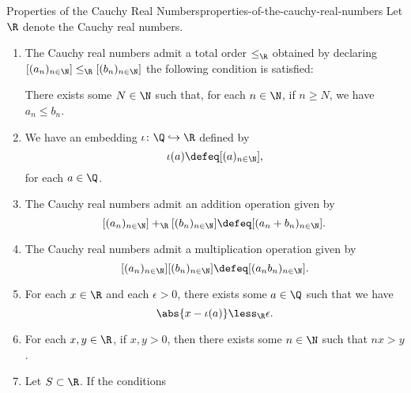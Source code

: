 \begin{proposition}{Properties of the Cauchy Real Numbers}{properties-of-the-cauchy-real-numbers}%
    Let $\R$ denote the Cauchy real numbers.
    \begin{enumerate}
        \item\label{properties-of-the-cauchy-real-numbers-total-order}The Cauchy real numbers admit a total order $\leq_{\R}$ obtained by declaring $[(a_{n})_{n\in\N}]\leq_{\R}[(b_{n})_{n\in\N}]$ \textiff the following condition is satisfied:
            \begin{itemize}
                \itemstar There exists some $N\in\N$ such that, for each $n\in\N$, if $n\geq N$, we have $a_{n}\leq b_{n}$.
            \end{itemize}
        \item\label{properties-of-the-cauchy-real-numbers-the-embedding-of-q-into-r}We have an embedding $\iota\colon\Q\hookrightarrow\R$ defined by
            \[
                \iota(a)%
                \defeq%
                [(a)_{n\in\N}],%
            \]%
            for each $a\in\Q$.
        \item\label{properties-of-the-cauchy-real-numbers-addition}The Cauchy real numbers admit an addition operation given by
            \[
                [(a_{n})_{n\in\N}]+_{\R}[(b_{n})_{n\in\N}]%
                \defeq%
                [(a_{n}+b_{n})_{n\in\N}].%
            \]%
        \item\label{properties-of-the-cauchy-real-numbers-multiplication}The Cauchy real numbers admit a multiplication operation given by
            \[
                [(a_{n})_{n\in\N}][(b_{n})_{n\in\N}]%
                \defeq%
                [(a_{n}b_{n})_{n\in\N}].%
            \]%
        \item\label{properties-of-the-cauchy-real-numbers-rational-approximation}For each $x\in\R$ and each $\epsilon\greater0$, there exists some $a\in\Q$ such that we have
            \[
                \abs{x-\iota(a)}%
                \less_{\R}%
                \epsilon.%
            \]%
        \item\label{properties-of-the-cauchy-real-numbers-the-archimedean-property}For each $x,y\in\R$, if $x,y\greater0$, then there exists some $n\in\N$ such that $nx\greater y$.
        \item\label{properties-of-the-cauchy-real-numbers-the-cauchy-real-numbers-admit-suprema-of-bounded-subsets}Let $S\subset\R$. If the conditions

\end{enumerate}
\end{proposition}
